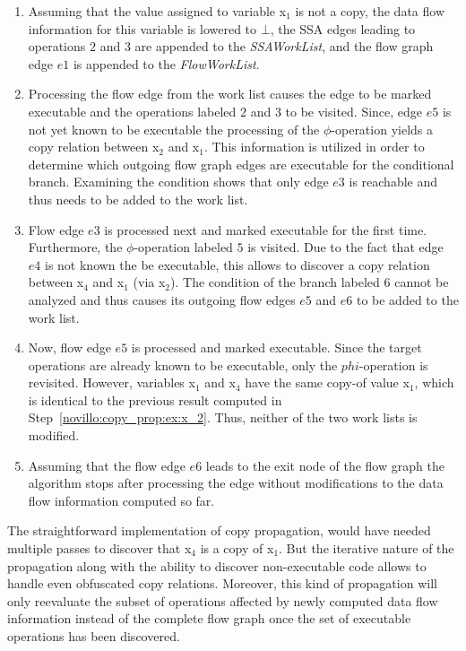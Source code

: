 \begin{enumerate}
\item Assuming that the value assigned to variable x$_1$ is not a copy, the data
      flow information for this variable is lowered to $\bot$, the SSA edges
      leading to operations $2$ and $3$ are appended to the \emph{SSAWorkList},
      and the flow graph edge $e1$ is appended to the \emph{FlowWorkList}.
\item \label{novillo:copy_prop:ex:x_2} Processing the flow edge from the
      work list causes the edge to be marked executable and the operations
      labeled $2$ and $3$ to be visited. Since, edge $e5$ is not yet known to be
      executable the processing of the $\phi$-operation yields a copy relation
      between x$_2$ and x$_1$. This information is utilized in order to
      determine which outgoing flow graph edges are executable for the
      conditional branch. Examining the condition shows that only edge $e3$ is
      reachable and thus needs to be added to the work list.
\item Flow edge $e3$ is processed next and marked executable for the first time.
      Furthermore, the $\phi$-operation labeled $5$ is visited. Due to the fact
      that edge $e4$ is not known the be executable, this allows to discover a
      copy relation between x$_4$ and x$_1$ (via x$_2$). The condition of the
      branch labeled $6$ cannot be analyzed and thus causes its outgoing flow
      edges $e5$ and $e6$ to be added to the work list.
\item Now, flow edge $e5$ is processed and marked executable. Since the target
      operations are already known to be executable, only the $phi$-operation is
      revisited. However, variables x$_1$ and x$_4$ have the same copy-of value
      x$_1$, which is identical to the previous result computed in
      Step~\ref{novillo:copy_prop:ex:x_2}. Thus, neither of the two work lists
      is modified.
\item Assuming that the flow edge $e6$ leads to the exit node of the flow graph
      the algorithm stops after processing the edge without modifications to
      the data flow information computed so far.
\end{enumerate}

The straightforward implementation of copy propagation, would have needed
multiple passes to discover that x$_4$ is a copy of x$_1$.  But the iterative
nature of the propagation along with the ability to discover non-executable
code allows to handle even obfuscated copy relations. Moreover, this kind of
propagation will only reevaluate the subset of operations affected by newly
computed data flow information instead of the complete flow graph once the set
of executable operations has been discovered.

